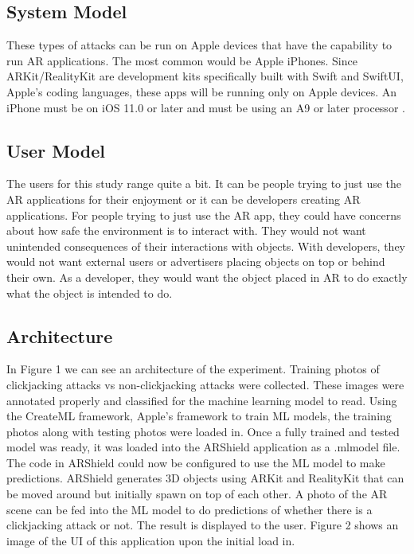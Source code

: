 \documentclass[conference]{IEEEtran}
\begin{document}
\subsection{System Model}

These types of attacks can be run on Apple devices that have the capability to run AR applications. The most common would be Apple iPhones. Since ARKit/RealityKit are development kits specifically built with Swift and SwiftUI, Apple's coding languages, these apps will be running only on Apple devices. An iPhone must be on iOS 11.0 or later and must be using an A9 or later processor \cite{noauthor_verifying_nodate}.

\subsection{User Model}

The users for this study range quite a bit. It can be people trying to just use the AR applications for their enjoyment or it can be developers creating AR applications. For people trying to just use the AR app, they could have concerns about how safe the environment is to interact with. They would not want unintended consequences of their interactions with objects. With developers, they would not want external users or advertisers placing objects on top or behind their own. As a developer, they would want the object placed in AR to do exactly what the object is intended to do. 


\subsection{Architecture}

In Figure 1 we can see an architecture of the experiment. Training photos of clickjacking attacks vs non-clickjacking attacks were collected. These images were annotated properly and classified for the machine learning model to read. Using the CreateML framework, Apple's framework to train ML models, the training photos along with testing photos were loaded in. Once a fully trained and tested model was ready, it was loaded into the ARShield application as a .mlmodel file. The code in ARShield could now be configured to use the ML model to make predictions. ARShield generates 3D objects using ARKit and RealityKit that can be moved around but initially spawn on top of each other. A photo of the AR scene can be fed into the ML model to do predictions of whether there is a clickjacking attack or not. The result is displayed to the user. Figure 2 shows an image of the UI of this application upon the initial load in. 
\end{document}
